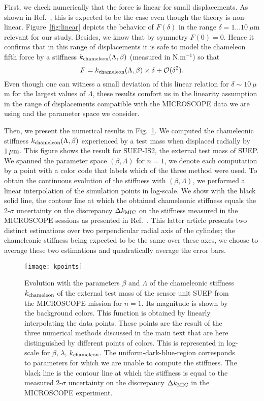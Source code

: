 \documentclass[aps,prd,twocolumn,superscriptaddress,nofootinbib,eqsecnumm,showpacs]{revtex4-1}
\renewcommand\({\left(}
\renewcommand\){\right)}
\renewcommand\[{\left[}
\renewcommand\]{\right]}
\begin{document}
First, we check numerically that the force is linear for small displacements. As shown in Ref.~\cite{PRD2}, this is expected to be the case even though the theory is non-linear. Figure~\ref{fig:linear} depicts the behavior of $F(\delta)$ in the range $\delta=1\ldots 10~\mu$m relevant for our study. Besides, we know that by symmetry $F(0)=0$. Hence it confirms that in this range of displacements it is safe to model the chameleon fifth force by a stiffness $k_{\rm chameleon}(\Lambda,\beta)$ (measured in N.m$^{-1}$) so that
\begin{equation}
 F = k_{\rm chameleon}(\Lambda,\beta) \times \delta +{\cal O}(\delta^2).
\end{equation}
Even though one can witness a small deviation of this linear relation for $\delta\sim 10~\mu$m for the largest values of $\Lambda$, these results comfort us in the linearity assumption in the range of displacements compatible with the MICROSCOPE data we are using and the parameter space we consider.

Then, we present the numerical results in Fig.~\ref{fig:kpoints}. We computed the chameleonic stiffness $ k_{\rm chameleon}(\Lambda,\beta)$ experienced by a test mass when displaced radially by $1 \,\mu{\rm m}$. This figure shows the result for SUEP-IS2, the external test mass of SUEP. We spanned the parameter space $(\beta,\Lambda)$ for $n = 1$, we denote each computation by a point with a color code that labels which of the three method were used. To obtain the continuous evolution of the stiffness with $(\beta,\Lambda)$, we performed a linear interpolation of the simulation points in log-scale. We show with the black solid line, the contour line at which the obtained chameleonic stiffness equals the 2-$\sigma$ uncertainty on the discrepancy $\Delta k_{\rm MIC}$ on the stiffness measured in the MICROSCOPE sessions as presented in Ref.~\cite{CQG2}. This latter article presents two distinct estimations over two perpendicular radial axis of the cylinder; the chameleonic stiffness being expected to be the same over these axes, we choose to average these two estimations and quadratically average the error bars. 

\begin{figure}
\texttt{[image: kpoints]}
\caption{Evolution with the parameters $\beta$ and $\Lambda$ of the chameleonic stiffness $k_{\rm chameleon}$ of the external test mass of the sensor unit SUEP from the MICROSCOPE mission for $n = 1$. Its magnitude is shown by the background colors. This function is obtained by linearly interpolating the data points. These points are the result of the three numerical methods discussed in the main text that are here distinguished by different points of colors. This is represented in log-scale for $\beta$, $\lambda$, $k_{\rm chameleon}$. The uniform-dark-blue-region corresponds to parameters for which we are unable to compute the stiffness. The black line is the contour line at which the stiffness is equal to the measured 2-$\sigma$ uncertainty on the discrepancy $\Delta k_{\rm MIC}$ in the MICROSCOPE experiment.}
\label{fig:kpoints}
\end{figure}
\end{document}
